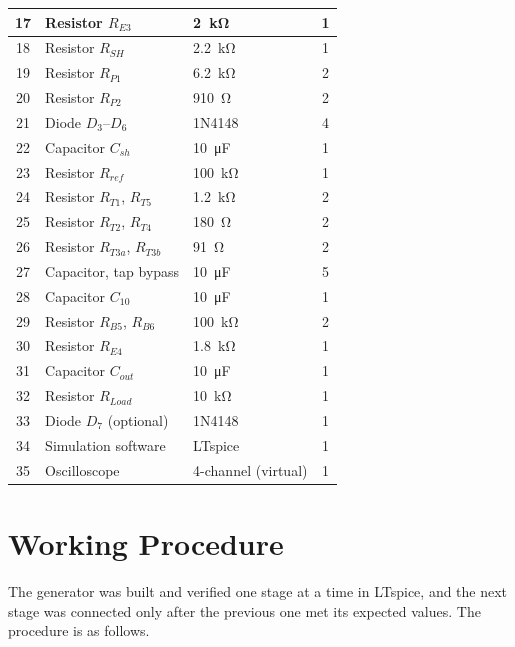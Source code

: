 \documentclass[12pt,a4paper]{article}
\begin{document}
\begin{longtable}{|c|l|l|c|}
		\hline
		17 & Resistor $R_{E3}$ & \SI{2}{\kilo\ohm} & 1 \\
		\hline
		18 & Resistor $R_{SH}$ & \SI{2.2}{\kilo\ohm} & 1 \\
		\hline
		19 & Resistor $R_{P1}$ & \SI{6.2}{\kilo\ohm} & 2 \\
		\hline
		20 & Resistor $R_{P2}$ & \SI{910}{\ohm} & 2 \\
		\hline
		21 & Diode $D_3$--$D_6$ & 1N4148 & 4 \\
		\hline
		22 & Capacitor $C_{sh}$ & \SI{10}{\micro\farad} & 1 \\
		\hline
		23 & Resistor $R_{ref}$ & \SI{100}{\kilo\ohm} & 1 \\
		\hline
		24 & Resistor $R_{T1}$, $R_{T5}$ & \SI{1.2}{\kilo\ohm} & 2 \\
		\hline
		25 & Resistor $R_{T2}$, $R_{T4}$ & \SI{180}{\ohm} & 2 \\
		\hline
		26 & Resistor $R_{T3a}$, $R_{T3b}$ & \SI{91}{\ohm} & 2 \\
		\hline
		27 & Capacitor, tap bypass & \SI{10}{\micro\farad} & 5 \\
		\hline
		28 & Capacitor $C_{10}$ & \SI{10}{\micro\farad} & 1 \\
		\hline
		29 & Resistor $R_{B5}$, $R_{B6}$ & \SI{100}{\kilo\ohm} & 2 \\
		\hline
		30 & Resistor $R_{E4}$ & \SI{1.8}{\kilo\ohm} & 1 \\
		\hline
		31 & Capacitor $C_{out}$ & \SI{10}{\micro\farad} & 1 \\
		\hline
		32 & Resistor $R_{Load}$ & \SI{10}{\kilo\ohm} & 1 \\
		\hline
		33 & Diode $D_7$ (optional) & 1N4148 & 1 \\
		\hline
		34 & Simulation software & LTspice & 1 \\
		\hline
		35 & Oscilloscope & 4-channel (virtual) & 1 \\
		\hline
	\end{longtable}

	\section{Working Procedure}
	The generator was built and verified one stage at a time in LTspice, and the next stage was connected only after the previous one met its expected values. The procedure is as follows.
\end{document}
